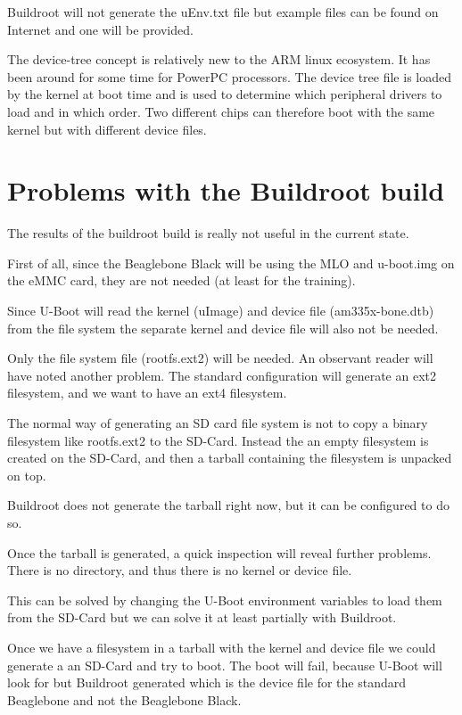Buildroot will not generate the uEnv.txt file but example files
can be found on Internet and one will be provided.

The device-tree concept is relatively new to the ARM linux ecosystem.
It has been around for some time for PowerPC processors. The device tree file
is loaded by the kernel at boot time and is used to determine which peripheral drivers
to load and in which order. Two different chips can therefore boot with the same kernel
but with different device files.


\section{Problems with the Buildroot build}

The results of the buildroot build is really not useful in the current state.

First of all, since the Beaglebone Black will be using the MLO and u-boot.img
on the eMMC card, they are not needed (at least for the training).

Since U-Boot will read the kernel (uImage) and device file (am335x-bone.dtb)
from the file system the separate kernel and device file will also not be needed.

Only the file system file (rootfs.ext2) will be needed.
An observant reader will have noted another problem.
The standard configuration will generate an ext2 filesystem,
and we want to have an ext4 filesystem.

The normal way of generating an SD card file system is not to
copy a binary filesystem like rootfs.ext2 to the SD-Card.
Instead the an empty filesystem is created on the SD-Card,
and then a tarball containing the filesystem is unpacked on top.

Buildroot does not generate the tarball right now, but it can be configured to do so.

Once the tarball is generated, a quick inspection will reveal further problems.
There is no  directory, and thus there is no kernel or device file.

This can be solved by changing the U-Boot environment variables to
load them from the SD-Card but we can solve it at least partially
with Buildroot.

Once we have a filesystem in a tarball with the kernel and device file we could
generate a an SD-Card and try to boot. The boot will fail, because U-Boot will
look for  but Buildroot generated 
which is the device file for the standard Beaglebone and not the Beaglebone Black.


